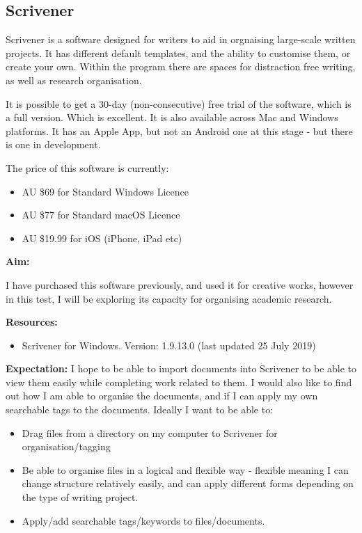 \documentclass{article}
\begin{document}
\subsection{Scrivener}

Scrivener is a software designed for writers to aid in orgnaising large-scale written projects. It has different default templates, and the ability to customise them, or create your own. Within the program there are spaces for distraction free writing, as well as research organisation. 

It is possible to get a 30-day (non-consecutive) free trial of the software, which is a full version. Which is excellent. It is also available across Mac and Windows platforms. It has an Apple App, but not an Android one at this stage - but there is one in development.

The price of this software is currently: 

\begin{itemize}
    \item AU \$69 for Standard Windows Licence
    \item AU \$77 for Standard macOS Licence
    \item AU \$19.99 for iOS (iPhone, iPad etc)
\end{itemize}

\textbf{Aim:}

I have purchased this software previously, and used it for creative works, however in this test, I will be exploring its capacity for organising academic research.

\textbf{Resources:}
\begin{itemize}
    \item Scrivener for Windows. Version: 1.9.13.0 (last updated 25 July 2019)
\end{itemize}

\textbf{Expectation:}
I hope to be able to import documents into Scrivener to be able to view them easily while completing work related to them. I would also like to find out how I am able to organise the documents, and if I can apply my own searchable tags to the documents.
Ideally I want to be able to:
\begin{itemize}
    \item Drag files from a directory on my computer to Scrivener for organisation/tagging
    \item Be able to organise files in a logical and flexible way - flexible meaning I can change structure relatively easily, and can apply different forms depending on the type of writing project.
    \item Apply/add searchable tags/keywords to files/documents.
\end{itemize}
\end{document}
